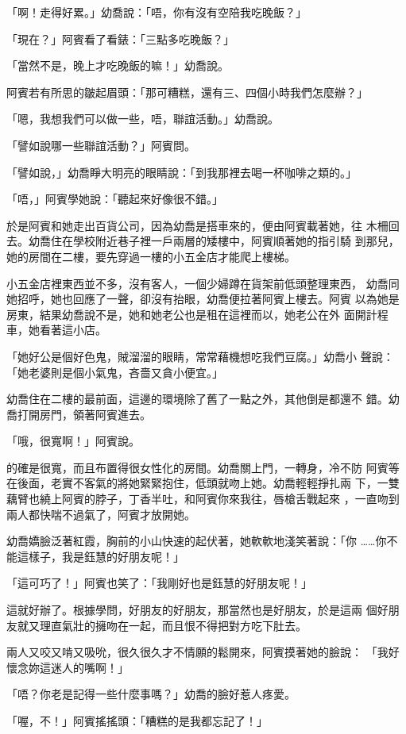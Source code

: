 「啊！走得好累。」幼喬說：「唔，你有沒有空陪我吃晚飯？」

「現在？」阿賓看了看錶：「三點多吃晚飯？」

「當然不是，晚上才吃晚飯的嘛！」幼喬說。

阿賓若有所思的皺起眉頭：「那可糟糕，還有三、四個小時我們怎麼辦？」

「嗯，我想我們可以做一些，唔，聯誼活動。」幼喬說。

「譬如說哪一些聯誼活動？」阿賓問。

「譬如說，」幼喬睜大明亮的眼睛說：「到我那裡去喝一杯咖啡之類的。」

「唔，」阿賓學她說：「聽起來好像很不錯。」

於是阿賓和她走出百貨公司，因為幼喬是搭車來的，便由阿賓載著她，往
木柵回去。幼喬住在學校附近巷子裡一戶兩層的矮樓中，阿賓順著她的指引騎
到那兒，她的房間在二樓，要先穿過一樓的小五金店才能爬上樓梯。

小五金店裡東西並不多，沒有客人，一個少婦蹲在貨架前低頭整理東西，
幼喬同她招呼，她也回應了一聲，卻沒有抬眼，幼喬便拉著阿賓上樓去。阿賓
以為她是房東，結果幼喬說不是，她和她老公也是租在這裡而以，她老公在外
面開計程車，她看著這小店。

「她好公是個好色鬼，賊溜溜的眼睛，常常藉機想吃我們豆腐。」幼喬小
聲說：「她老婆則是個小氣鬼，吝嗇又貪小便宜。」

幼喬住在二樓的最前面，這邊的環境除了舊了一點之外，其他倒是都還不
錯。幼喬打開房門，領著阿賓進去。

「哦，很寬啊！」阿賓說。

的確是很寬，而且布置得很女性化的房間。幼喬關上門，一轉身，冷不防
阿賓等在後面，老實不客氣的將她緊緊抱住，低頭就吻上她。幼喬輕輕掙扎兩
下，一雙藕臂也繞上阿賓的脖子，丁香半吐，和阿賓你來我往，唇槍舌戰起來
，一直吻到兩人都快喘不過氣了，阿賓才放開她。

幼喬嬌臉泛著紅霞，胸前的小山快速的起伏著，她軟軟地淺笑著說：「你
……你不能這樣子，我是鈺慧的好朋友呢！」

「這可巧了！」阿賓也笑了：「我剛好也是鈺慧的好朋友呢！」

這就好辦了。根據學問，好朋友的好朋友，那當然也是好朋友，於是這兩
個好朋友就又理直氣壯的擁吻在一起，而且恨不得把對方吃下肚去。

兩人又咬又啃又吸吮，很久很久才不情願的鬆開來，阿賓摸著她的臉說：
「我好懷念妳這迷人的嘴啊！」

「唔？你老是記得一些什麼事嗎？」幼喬的臉好惹人疼愛。

「喔，不！」阿賓搖搖頭：「糟糕的是我都忘記了！」

